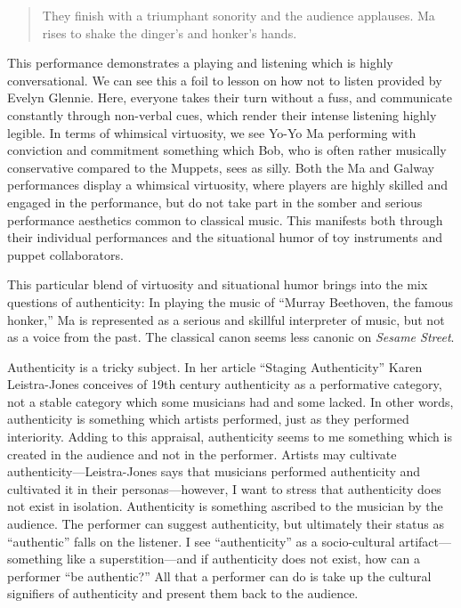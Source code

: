\documentclass[12pt,letterpaper]{article}
\begin{document}
\begin{quote}
	They finish with a triumphant sonority and the audience applauses. Ma 
	rises to shake the dinger's and honker's hands.\autocite{MaHonkers} 

	\end{quote}

	This performance demonstrates a playing and listening which is highly 
	conversational. We can see this a foil to lesson on how not to listen 
	provided by Evelyn Glennie. Here, everyone takes their turn without a 
	fuss, and communicate constantly through non-verbal cues, which render 
	their intense listening highly legible. In terms of whimsical
	virtuosity, we see Yo-Yo Ma performing with conviction and commitment 
	something which Bob, who is often rather musically conservative compared
	to the Muppets, sees as silly. Both the Ma and Galway performances 
	display a whimsical virtuosity, where players are highly skilled and 
	engaged in the performance, but do not take part in the somber and 
	serious performance aesthetics common to classical music. This manifests
	both through their individual performances and the situational humor of
	toy instruments and puppet collaborators. 

	This particular blend of virtuosity and situational
	humor brings into the mix questions of authenticity: In playing the
	music of ``Murray Beethoven, the famous honker,'' Ma is represented as a
	serious and skillful interpreter of music, but not as a voice from the 
	past. The classical canon seems less canonic on \textit{Sesame Street}.

	Authenticity is a tricky subject.
        In her article ``Staging Authenticity'' Karen Leistra-Jones conceives of
	19th century authenticity as a performative category, not a stable 
	category which some musicians had and some 
	lacked.\autocite[400]{Jones2013} In other words, authenticity is 
	something which artists performed, just as they performed interiority. 
	Adding to this appraisal, authenticity seems to me something which is 
	created in the audience and not in the performer. Artists may cultivate
	authenticity---Leistra-Jones says that musicians performed authenticity
	and cultivated it in their personas---however, I want to stress that 
	authenticity does not exist in isolation. Authenticity is something 
	ascribed to the musician by the audience. The performer can suggest 
	authenticity, but ultimately their status as ``authentic'' falls on the 
	listener. I see ``authenticity'' as a socio-cultural artifact---
	something like a superstition---and if authenticity does not exist, how 
	can a performer ``be authentic?'' All that a performer can do is take 
	up the cultural signifiers of authenticity and present them back to the 
	audience.
\end{document}
